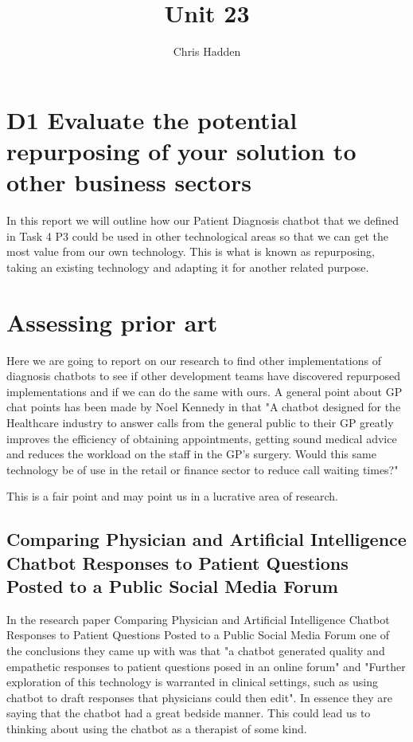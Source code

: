 \documentclass{article}
\title{Unit 23}
\author{Chris Hadden}
\date{}
\begin{document}
\maketitle
\section{D1 Evaluate the potential repurposing of your solution to other business sectors}
In this report we will outline how our Patient Diagnosis chatbot that we defined in Task 4 P3 could be used in other technological areas so that we can get the most value from our own technology. This is what is known as repurposing, taking an existing technology and adapting it for another related purpose.
\smallbreak
\section{Assessing prior art}
Here we are going to report on our research to find other implementations of diagnosis chatbots to see if other development teams have discovered repurposed implementations and if we can do the same with ours.
\smallbreak
A general point about GP chat points has been made by Noel Kennedy in that "A chatbot designed for the Healthcare industry to answer calls from the general public to
their GP greatly improves the efficiency of obtaining appointments, getting sound medical advice and reduces the workload on the staff in the GP’s surgery. Would this same technology be of use in the retail or finance sector to reduce call waiting times?" \cite{Noel}

This is a fair point and may point us in a lucrative area of research.
\smallbreak

\subsection{Comparing Physician and Artificial Intelligence Chatbot Responses to Patient Questions Posted to a Public Social Media Forum}
In the research paper Comparing Physician and Artificial Intelligence Chatbot Responses to Patient Questions Posted to a Public Social Media Forum\cite{bedside} one of the conclusions they came up with was that "a chatbot generated quality and empathetic responses to patient questions posed in an online forum" and "Further exploration of this technology is warranted in clinical settings, such as using chatbot to draft responses that physicians could then edit". In essence they are saying that the chatbot had a great bedside manner. This could lead us to thinking about using the chatbot as a therapist of some kind.
\end{document}

